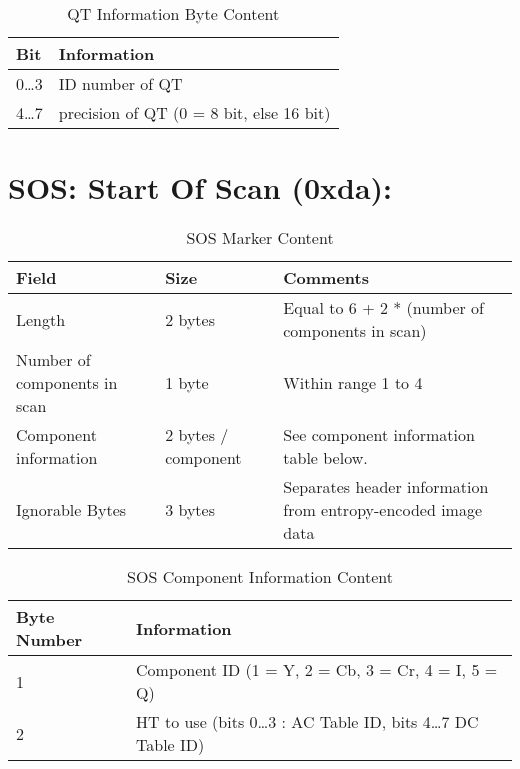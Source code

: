 \begin{table}[!hbtp]
	\label{dqt-info-content}
	\caption{QT Information Byte Content}
	\centering
	\begin{tabular}{ | p{2cm} | p{4cm} | }
	\hline
	\textbf{Bit} &  \textbf{Information} \\ \hline
	0\ldots3 & ID number of QT\\ \hline
	4\ldots7 & precision of QT (0 = 8 bit, else 16 bit)\\ \hline
	\end{tabular}
\end{table}

\newpage

\section{SOS: Start Of Scan (0xda):}

\begin{table}[!hbtp]
	\label{sos-content}
	\caption{SOS Marker Content}
	\centering
	\begin{tabular}{ | p{2cm} | p{1.5cm} | p{4cm} | }
	\hline
	\textbf{Field} & \textbf{Size} & \textbf{Comments} \\ \hline
	Length & 2 bytes & Equal to 6 + 2 * (number of components in scan)\\ \hline
	Number of components in scan & 1 byte & Within range 1 to 4\\ \hline
	Component information & 2 bytes / component & See component information table below.\\ \hline
	Ignorable Bytes & 3 bytes & Separates header information from entropy-encoded image data\\ \hline
	\end{tabular}
\end{table}

\begin{table}[!hbtp]
	\label{sof-comp-content}
	\caption{SOS Component Information Content}
	\centering
	\begin{tabular}{ | p{2cm} | p{4cm} | }
	\hline
	\textbf{Byte Number} &  \textbf{Information} \\ \hline
	1 & Component ID (1 = Y, 2 = Cb, 3 = Cr, 4 = I, 5 = Q)\\ \hline
	2 & HT to use (bits 0\ldots3 : AC Table ID, bits 4\ldots7 DC Table ID)\\ \hline
	\end{tabular}
\end{table}
